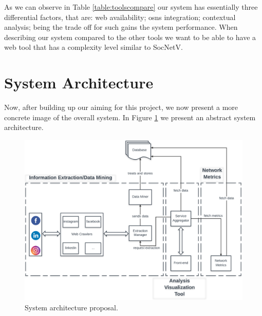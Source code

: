 As we can observe in Table \ref{table:toolscompare} our system has essentially three differential factors, that are: web availability; \glspl{osn} integration; contextual analysis; being the trade off for such gains the system performance. When describing our system compared to the other tools we want to be able to have a web tool that has a complexity level similar to SocNetV.

\section{System Architecture}

Now, after building up our aiming for this project, we now present a more concrete image of the overall system. In Figure \ref{img:architectureprop} we present an abstract system architecture.

\begin{figure}[h!]
\begin{center}
  \hspace*{-0.8in}
  \includegraphics[width=1.2\textwidth]{img/architecture.png}
\end{center}
\caption{\label{img:architectureprop} System architecture proposal.}
\end{figure}

